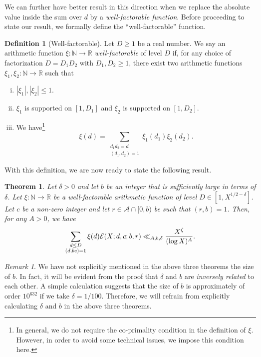 \documentclass[12pt]{amsart}
\numberwithin{equation}{section}
\newtheorem{thm}{Theorem}
\theoremstyle{remark}
\newtheorem*{remark}{Remark}
\theoremstyle{definition}
\newtheorem{definition}[theorem]{Definition}
\begin{document}
We can further have better result in this direction when we replace the absolute value inside the sum over $d$ by a \emph{well-factorable function}. Before proceeding to state our result, we formally define the ``well-factorable'' function.

\begin{definition}[Well-factorable]\label{def: well fac}
Let $D\geq 1$ be a real number. We say an arithmetic function $\xi:\mathbb{N}\rightarrow\mathbb{R}$ \emph{well-factorable} of level $D$ if, for any choice of factorization $D = D_1D_2$ with $D_1, D_2 \geq 1$, there exist two arithmetic functions $\xi_1, \xi_2:\mathbb{N}\rightarrow\mathbb{R}$ such that
\begin{enumerate}[(i)]
\item $|\xi_1|, |\xi_2|\leq 1$.
\item $\xi_1$ is supported on $[1, D_1]$ and $\xi_2$ is supported on $[1, D_2]$.
\item We have\footnote{In general, we do not require the co-primality condition in the definition of $\xi$. However, in order to avoid some technical issues, we impose this condition here.}
\[\xi(d)=\sum_{\substack{d_1d_2=d\\(d_1, d_2)=1}}\xi_1(d_1)\xi_2(d_2).\]
\end{enumerate}
\end{definition}
With this definition, we are now ready to state the following result.

\begin{thm}\label{Main Theorem3}
Let $\delta>0$ and let $b$ be an integer that is sufficiently large in terms of $\delta$. Let $\xi:\mathbb{N}\rightarrow\mathbb{R}$ be a well-factorable arithmetic function of level $D\in [1, X^{1/2-\delta}]$. Let $c$ be a non-zero integer and let $r\in \mathcal{A}\cap[0,b)$ be such that $(r, b)=1$. Then, for any $A>0$, we have
\begin{align}
\notag \sum_{\substack{d\leq D\\ (d,bc)=1}}\xi(d)\mathcal{E}(X; d, c; b, r) \ll_{A,b,\delta}\dfrac{X^{\zeta}}{(\log X)^A}.
\end{align}
\end{thm}
\begin{remark}
We have not explicitly mentioned in the above three theorems the size of $b$. In fact, it will be evident from the proof that $\delta$ and $b$ are \emph{inversely related} to each other. A simple calculation suggests that the size of $b$ is approximately of order $10^{632}$ if we take $\delta=1/100$. Therefore, we will refrain from explicitly calculating $\delta$ and $b$ in the above three theorems.
\end{remark}
\end{document}
